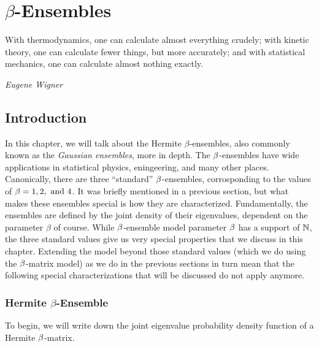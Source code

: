 
\chapter{$\beta$-Ensembles}

\epigraph{With thermodynamics, one can calculate almost everything crudely; with kinetic theory, one can calculate fewer things, but more accurately;
and with statistical mechanics, one can calculate almost nothing exactly.}{\textit{Eugene Wigner}}

\section{Introduction}

In this chapter, we will talk about the Hermite $\beta$-ensembles, also commonly known as the \textit{Gaussian ensembles}, more in depth.
The $\beta$-ensembles have wide applications in statistical physics, eningeering, and many other places.
Canonically, there are three ``standard'' $\beta$-ensembles, corrosponding to the values of $\beta = 1, 2, \text{ and } 4$.
It was briefly mentioned in a previous section, but what makes these ensembles special is how they are characterized.
Fundamentally, the ensembles are defined by the joint density of their eigenvalues, dependent on the parameter $\beta$ of course.
While $\beta$-ensemble model parameter $\beta$ has a support of $\mathbb{N}$, the three standard values give us very special properties that we discuss in this chapter.
Extending the model beyond those standard values (which we do using the $\beta$-matrix model) as we do in the previous sections in turn mean that the following special characterizations
that will be discussed do not apply anymore.

\newpage
\subsection{Hermite $\beta$-Ensemble}

To begin, we will write down the joint eigenvalue probability density function of a Hermite $\beta$-matrix.


